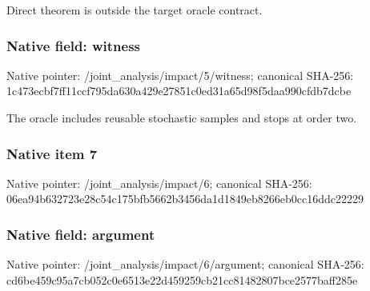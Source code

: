 \documentclass[10pt,a4paper]{article}
\begin{document}
\begingroup\raggedright\sloppy Direct theorem is outside the target oracle contract.\par\endgroup

\subsubsection{Native field: witness}
Native pointer: /joint\_\allowbreak{}analysis/impact/5/witness; canonical SHA-256: 1c473ecbf7ff11ccf795da630a429e27851c0ed31a65d98f5daa990cfdb7dcbe

\begingroup\raggedright\sloppy The oracle includes reusable stochastic samples and stops at order two.\par\endgroup

\subsubsection{Native item 7}
Native pointer: /joint\_\allowbreak{}analysis/impact/6; canonical SHA-256: 06ea94b632723e28c54c175bfb5662b3456da1d1849eb8266eb0cc16ddc22229

\subsubsection{Native field: argument}
Native pointer: /joint\_\allowbreak{}analysis/impact/6/argument; canonical SHA-256: cd6be459c95a7cb052c0e6513e22d459259cb21cc81482807bce2577baff285e
\end{document}

